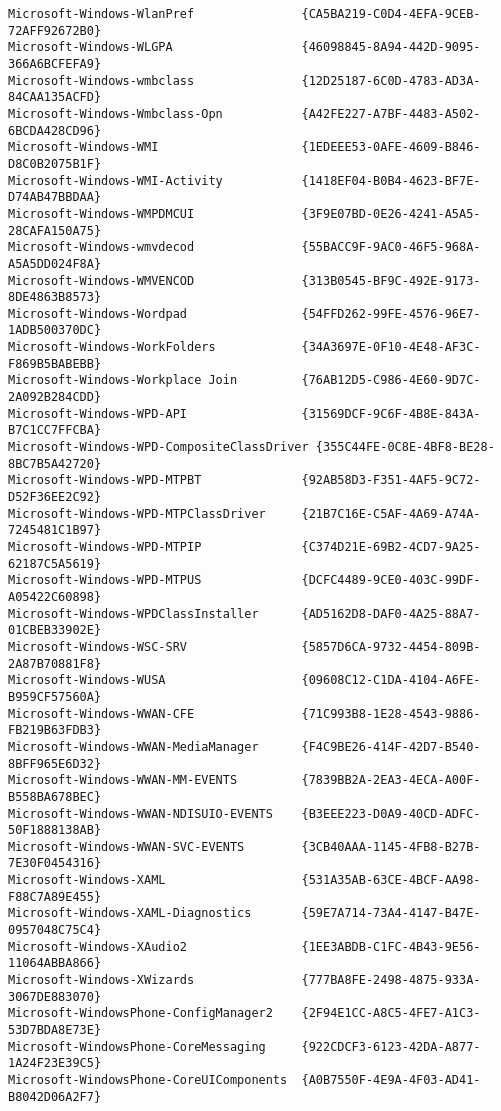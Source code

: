 \documentclass{report}
\begin{document}
\begin{lstlisting}[breaklines=true,basicstyle=\tiny]
Microsoft-Windows-WlanPref               {CA5BA219-C0D4-4EFA-9CEB-72AFF92672B0}
Microsoft-Windows-WLGPA                  {46098845-8A94-442D-9095-366A6BCFEFA9}
Microsoft-Windows-wmbclass               {12D25187-6C0D-4783-AD3A-84CAA135ACFD}
Microsoft-Windows-Wmbclass-Opn           {A42FE227-A7BF-4483-A502-6BCDA428CD96}
Microsoft-Windows-WMI                    {1EDEEE53-0AFE-4609-B846-D8C0B2075B1F}
Microsoft-Windows-WMI-Activity           {1418EF04-B0B4-4623-BF7E-D74AB47BBDAA}
Microsoft-Windows-WMPDMCUI               {3F9E07BD-0E26-4241-A5A5-28CAFA150A75}
Microsoft-Windows-wmvdecod               {55BACC9F-9AC0-46F5-968A-A5A5DD024F8A}
Microsoft-Windows-WMVENCOD               {313B0545-BF9C-492E-9173-8DE4863B8573}
Microsoft-Windows-Wordpad                {54FFD262-99FE-4576-96E7-1ADB500370DC}
Microsoft-Windows-WorkFolders            {34A3697E-0F10-4E48-AF3C-F869B5BABEBB}
Microsoft-Windows-Workplace Join         {76AB12D5-C986-4E60-9D7C-2A092B284CDD}
Microsoft-Windows-WPD-API                {31569DCF-9C6F-4B8E-843A-B7C1CC7FFCBA}
Microsoft-Windows-WPD-CompositeClassDriver {355C44FE-0C8E-4BF8-BE28-8BC7B5A42720}
Microsoft-Windows-WPD-MTPBT              {92AB58D3-F351-4AF5-9C72-D52F36EE2C92}
Microsoft-Windows-WPD-MTPClassDriver     {21B7C16E-C5AF-4A69-A74A-7245481C1B97}
Microsoft-Windows-WPD-MTPIP              {C374D21E-69B2-4CD7-9A25-62187C5A5619}
Microsoft-Windows-WPD-MTPUS              {DCFC4489-9CE0-403C-99DF-A05422C60898}
Microsoft-Windows-WPDClassInstaller      {AD5162D8-DAF0-4A25-88A7-01CBEB33902E}
Microsoft-Windows-WSC-SRV                {5857D6CA-9732-4454-809B-2A87B70881F8}
Microsoft-Windows-WUSA                   {09608C12-C1DA-4104-A6FE-B959CF57560A}
Microsoft-Windows-WWAN-CFE               {71C993B8-1E28-4543-9886-FB219B63FDB3}
Microsoft-Windows-WWAN-MediaManager      {F4C9BE26-414F-42D7-B540-8BFF965E6D32}
Microsoft-Windows-WWAN-MM-EVENTS         {7839BB2A-2EA3-4ECA-A00F-B558BA678BEC}
Microsoft-Windows-WWAN-NDISUIO-EVENTS    {B3EEE223-D0A9-40CD-ADFC-50F1888138AB}
Microsoft-Windows-WWAN-SVC-EVENTS        {3CB40AAA-1145-4FB8-B27B-7E30F0454316}
Microsoft-Windows-XAML                   {531A35AB-63CE-4BCF-AA98-F88C7A89E455}
Microsoft-Windows-XAML-Diagnostics       {59E7A714-73A4-4147-B47E-0957048C75C4}
Microsoft-Windows-XAudio2                {1EE3ABDB-C1FC-4B43-9E56-11064ABBA866}
Microsoft-Windows-XWizards               {777BA8FE-2498-4875-933A-3067DE883070}
Microsoft-WindowsPhone-ConfigManager2    {2F94E1CC-A8C5-4FE7-A1C3-53D7BDA8E73E}
Microsoft-WindowsPhone-CoreMessaging     {922CDCF3-6123-42DA-A877-1A24F23E39C5}
Microsoft-WindowsPhone-CoreUIComponents  {A0B7550F-4E9A-4F03-AD41-B8042D06A2F7}

\end{lstlisting}
\end{document}
